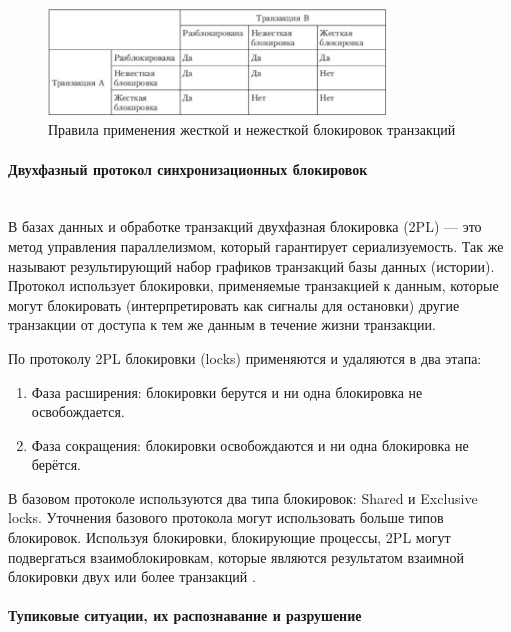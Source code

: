\begin{figure}[h!]
    \centering
    \includegraphics[width=0.8\textwidth]{assets/blocks.PNG}
    \caption{Правила применения жесткой и нежесткой блокировок транзакций}
\end{figure}


\paragraph{Двухфазный протокол синхронизационных блокировок}~\\

В базах данных и обработке транзакций двухфазная блокировка (2PL) — это метод управления параллелизмом, который гарантирует сериализуемость. Так же называют результирующий набор графиков транзакций базы данных (истории). Протокол использует блокировки, применяемые транзакцией к данным, которые могут блокировать (интерпретировать как сигналы для остановки) другие транзакции от доступа к тем же данным в течение жизни транзакции.

По протоколу 2PL блокировки (locks) применяются и удаляются в два этапа:
\begin{enumerate}
\item Фаза расширения: блокировки берутся и ни одна блокировка не освобождается.
\item Фаза сокращения: блокировки освобождаются и ни одна блокировка не берётся.
\end{enumerate}

В базовом протоколе используются два типа блокировок: Shared и Exclusive locks. Уточнения базового протокола могут использовать больше типов блокировок. Используя блокировки, блокирующие процессы, 2PL могут подвергаться взаимоблокировкам, которые являются результатом взаимной блокировки двух или более транзакций \autocite{Wiki}.

\paragraph{Тупиковые ситуации, их распознавание и разрушение} ~\\

